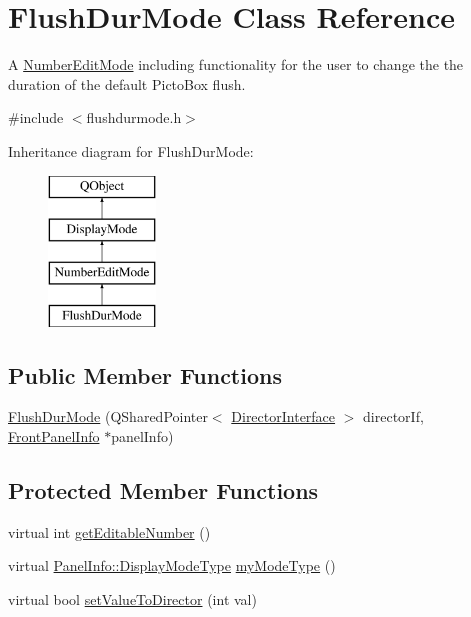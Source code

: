 \hypertarget{class_flush_dur_mode}{\section{Flush\-Dur\-Mode Class Reference}
\label{class_flush_dur_mode}
}


A \hyperlink{class_number_edit_mode}{Number\-Edit\-Mode} including functionality for the user to change the the duration of the default Picto\-Box flush.  




{\ttfamily \#include $<$flushdurmode.\-h$>$}

Inheritance diagram for Flush\-Dur\-Mode\-:\begin{figure}[H]
\begin{center}
\leavevmode
\includegraphics[height=4.000000cm]{class_flush_dur_mode}
\end{center}
\end{figure}
\subsection*{Public Member Functions}
\begin{DoxyCompactItemize}
\item 
\hyperlink{class_flush_dur_mode_aa5e00e600c486e467cffed15f8a51375}{Flush\-Dur\-Mode} (Q\-Shared\-Pointer$<$ \hyperlink{class_director_interface}{Director\-Interface} $>$ director\-If, \hyperlink{class_front_panel_info}{Front\-Panel\-Info} $\ast$panel\-Info)
\end{DoxyCompactItemize}
\subsection*{Protected Member Functions}
\begin{DoxyCompactItemize}
\item 
virtual int \hyperlink{class_flush_dur_mode_ad6e75ddfb5182dd935ca776a664c2366}{get\-Editable\-Number} ()
\item 
virtual \hyperlink{namespace_panel_info_adb8b98e092c15e831aa524d39701d565}{Panel\-Info\-::\-Display\-Mode\-Type} \hyperlink{class_flush_dur_mode_a4d510988b8969a85d6a3ca6a144a4ba3}{my\-Mode\-Type} ()
\item 
virtual bool \hyperlink{class_flush_dur_mode_ac83402e2e8d25ccfc889105f04110974}{set\-Value\-To\-Director} (int val)
\end{DoxyCompactItemize}

